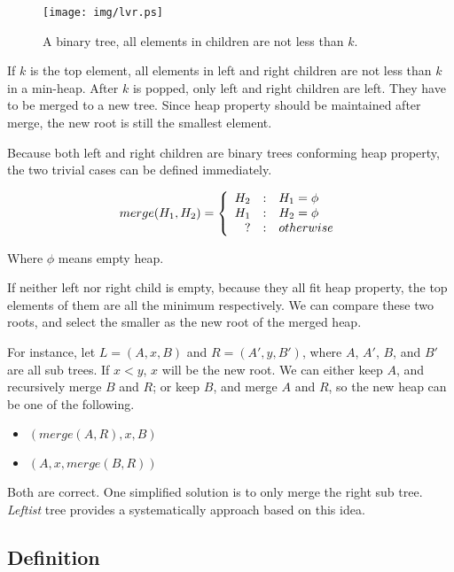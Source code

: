 \documentclass{article}
\begin{document}
\begin{figure}[htbp]
    \centering
    \texttt{[image: img/lvr.ps]}
    \caption{A binary tree, all elements in children are not less than $k$.} \label{fig:lvr}
\end{figure}

If $k$ is the top element, all elements in left and right children are not less
than $k$ in a min-heap. After $k$ is popped, only left and right children are left.
They have to be merged to a new tree. Since heap property should be maintained
after merge, the new root is still the smallest element.

Because both left and right children are binary trees conforming heap property,
the two trivial cases can be defined immediately.

\[
merge(H_1, H_2) = \left \{
  \begin{array}
  {r@{\quad:\quad}l}
  H_2 & H_1 = \phi \\
  H_1 & H_2 = \phi \\
  ? & otherwise
  \end{array}
\right.
\]

Where $\phi$ means empty heap.

If neither left nor right child is empty, because they all fit
heap property, the top elements of them are all the minimum respectively.
We can compare these two roots,
and select the smaller as the new root of the merged heap.

For instance, let $L = (A, x, B)$ and $R = (A', y, B')$, where $A$, $A'$, $B$,
and $B'$ are all sub trees. If $x < y$, $x$ will be the new root.
We can either keep $A$, and recursively merge $B$ and $R$; or
keep $B$, and merge $A$ and $R$, so the new heap can be one
of the following.

\begin{itemize}
\item $(merge(A, R), x, B)$
\item $(A, x, merge(B, R))$
\end{itemize}

Both are correct. One simplified solution is to only merge the right
sub tree. {\em Leftist} tree provides a systematically approach based on this
idea.

\subsection{Definition}
\end{document}
